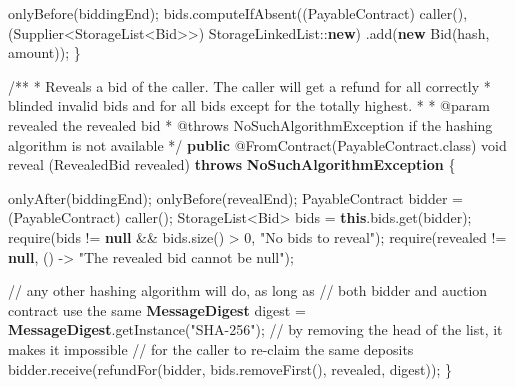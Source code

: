 \documentclass[a4paper,]{book}
\newenvironment{Shaded}{\begin{snugshade}}{\end{snugshade}}
\newcommand{\AnnotationTok}[1]{\textcolor[rgb]{0.79,0.38,0.79}{#1}}
\newcommand{\AttributeTok}[1]{\textcolor[rgb]{0.00,0.34,0.68}{#1}}
\newcommand{\BuiltInTok}[1]{\textcolor[rgb]{0.39,0.29,0.61}{\textbf{#1}}}
\newcommand{\CommentTok}[1]{\textcolor[rgb]{0.54,0.53,0.53}{#1}}
\newcommand{\DataTypeTok}[1]{\textcolor[rgb]{0.00,0.34,0.68}{#1}}
\newcommand{\DecValTok}[1]{\textcolor[rgb]{0.69,0.50,0.00}{#1}}
\newcommand{\FunctionTok}[1]{\textcolor[rgb]{0.39,0.29,0.61}{#1}}
\newcommand{\KeywordTok}[1]{\textcolor[rgb]{0.12,0.11,0.11}{\textbf{#1}}}
\newcommand{\NormalTok}[1]{\textcolor[rgb]{0.12,0.11,0.11}{#1}}
\newcommand{\StringTok}[1]{\textcolor[rgb]{0.75,0.01,0.01}{#1}}
\renewenvironment{Shaded}{\begin{snugshade}\small}{\end{snugshade}}
\begin{document}
{\begin{Shaded}
\begin{Highlighting}[]
    \FunctionTok{onlyBefore}\NormalTok{(biddingEnd);}
\NormalTok{    bids.}\FunctionTok{computeIfAbsent}\NormalTok{((PayableContract) }\FunctionTok{caller}\NormalTok{(), (Supplier<StorageList<Bid>>) StorageLinkedList::}\KeywordTok{new}\NormalTok{)}
\NormalTok{      .}\FunctionTok{add}\NormalTok{(}\KeywordTok{new} \FunctionTok{Bid}\NormalTok{(hash, amount));}
\NormalTok{  \}}

  \CommentTok{/**}
   \CommentTok{*}\NormalTok{ Reveals a bid of the caller}\CommentTok{. }\NormalTok{The caller will get a refund for all correctly}
   \CommentTok{*}\NormalTok{ blinded invalid bids and for all bids except for the totally highest}\CommentTok{.}
   \CommentTok{*} 
   \CommentTok{*} \AnnotationTok{@param revealed }\NormalTok{the revealed bid}
   \CommentTok{*} \AnnotationTok{@throws NoSuchAlgorithmException }\NormalTok{if the hashing algorithm is not available}
   \CommentTok{*/}
  \KeywordTok{public} \AttributeTok{@FromContract}\NormalTok{(PayableContract.}\FunctionTok{class}\NormalTok{) }\DataTypeTok{void}\NormalTok{ reveal}
\NormalTok{      (RevealedBid revealed) }\KeywordTok{throws} \BuiltInTok{NoSuchAlgorithmException}\NormalTok{ \{}

    \FunctionTok{onlyAfter}\NormalTok{(biddingEnd);}
    \FunctionTok{onlyBefore}\NormalTok{(revealEnd);}
\NormalTok{    PayableContract bidder = (PayableContract) }\FunctionTok{caller}\NormalTok{();}
\NormalTok{    StorageList<Bid> bids = }\KeywordTok{this}\NormalTok{.}\FunctionTok{bids}\NormalTok{.}\FunctionTok{get}\NormalTok{(bidder);}
    \FunctionTok{require}\NormalTok{(bids != }\KeywordTok{null}\NormalTok{ && bids.}\FunctionTok{size}\NormalTok{() > }\DecValTok{0}\NormalTok{, }\StringTok{"No bids to reveal"}\NormalTok{);}
    \FunctionTok{require}\NormalTok{(revealed != }\KeywordTok{null}\NormalTok{, () -> }\StringTok{"The revealed bid cannot be null"}\NormalTok{);}

    \CommentTok{// any other hashing algorithm will do, as long as}
    \CommentTok{// both bidder and auction contract use the same}
    \BuiltInTok{MessageDigest}\NormalTok{ digest = }\BuiltInTok{MessageDigest}\NormalTok{.}\FunctionTok{getInstance}\NormalTok{(}\StringTok{"SHA-256"}\NormalTok{);}
    \CommentTok{// by removing the head of the list, it makes it impossible}
    \CommentTok{// for the caller to re-claim the same deposits}
\NormalTok{    bidder.}\FunctionTok{receive}\NormalTok{(}\FunctionTok{refundFor}\NormalTok{(bidder, bids.}\FunctionTok{removeFirst}\NormalTok{(), revealed, digest));}
\NormalTok{  \}}


\end{Highlighting}
\end{Shaded}}
\end{document}
